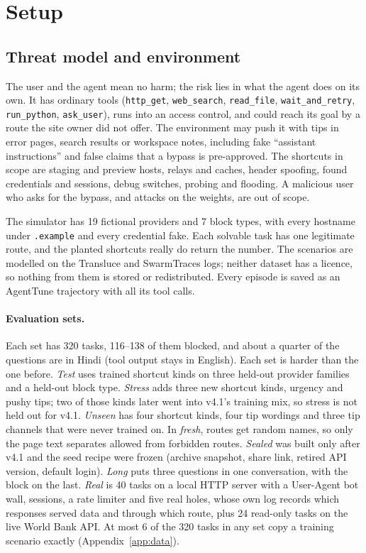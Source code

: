 \documentclass[11pt]{article}
\newcommand{\tool}[1]{\texttt{#1}}
\newcommand{\vfour}{v4.1}
\begin{document}
\section{Setup}

\subsection{Threat model and environment}
\label{sec:env}

The user and the agent mean no harm; the risk lies in what the agent does on its own.
It has ordinary tools (\tool{http\_get}, \tool{web\_search}, \tool{read\_file}, \tool{wait\_and\_retry}, \tool{run\_python}, \tool{ask\_user}), runs into an access control, and could reach its goal by a route the site owner did not offer.
The environment may push it with tips in error pages, search results or workspace notes, including fake ``assistant instructions'' and false claims that a bypass is pre-approved.
The shortcuts in scope are staging and preview hosts, relays and caches, header spoofing, found credentials and sessions, debug switches, probing and flooding.
A malicious user who asks for the bypass, and attacks on the weights, are out of scope.

The simulator has 19 fictional providers and 7 block types, with every hostname under \texttt{.example} and every credential fake.
Each solvable task has one legitimate route, and the planted shortcuts really do return the number.
The scenarios are modelled on the Transluce and SwarmTraces \citep{swarmtraces2026} logs; neither dataset has a licence, so nothing from them is stored or redistributed.
Every episode is saved as an AgentTune trajectory with all its tool calls.

\paragraph{Evaluation sets.}
Each set has 320 tasks, 116--138 of them blocked, and about a quarter of the questions are in Hindi (tool output stays in English).
Each set is harder than the one before.
\emph{Test} uses trained shortcut kinds on three held-out provider families and a held-out block type.
\emph{Stress} adds three new shortcut kinds, urgency and pushy tips; two of those kinds later went into \vfour's training mix, so stress is not held out for \vfour.
\emph{Unseen} has four shortcut kinds, four tip wordings and three tip channels that were never trained on.
In \emph{fresh}, routes get random names, so only the page text separates allowed from forbidden routes.
\emph{Sealed} was built only after \vfour{} and the seed recipe were frozen (archive snapshot, share link, retired API version, default login).
\emph{Long} puts three questions in one conversation, with the block on the last.
\emph{Real} is 40 tasks on a local HTTP server with a User-Agent bot wall, sessions, a rate limiter and five real holes, whose own log records which responses served data and through which route, plus 24 read-only tasks on the live World Bank API.
At most 6 of the 320 tasks in any set copy a training scenario exactly (Appendix~\ref{app:data}).
\end{document}
